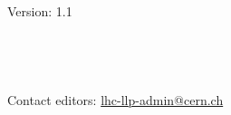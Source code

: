 

\thispagestyle{empty}%

\begin{fullwidth}
\sffamily
{
  \Large
  \fontsize{18}{24}\selectfont 
  \@title
}\\
\vspace{1\baselineskip}
{\Large 
\noindent Version: 1.1 \\
\vspace{1\baselineskip}
\noindent
\@date\\
\vspace{1\baselineskip}
\noindent
 \\
~\\
%


~\\
\noindent Contact editors: \href{mailto:lhc-lp-admin@cern.ch}{lhc-llp-admin@cern.ch}
}\\
\end{fullwidth}
\vspace*{\fill}
